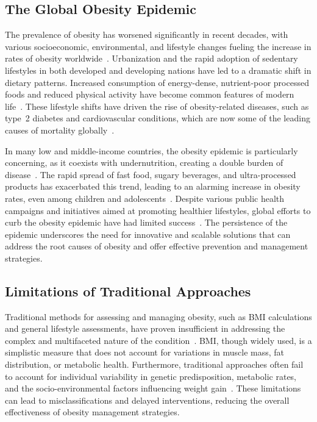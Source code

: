 \documentclass[12pt, a4paper]{article}
\begin{document}
\subsection{The Global Obesity Epidemic}

The prevalence of obesity has worsened significantly in recent decades, with various
socioeconomic, environmental, and lifestyle changes fueling the increase in rates of
obesity worldwide~\cite{ng2014}. Urbanization and the rapid adoption of sedentary
lifestyles in both developed and developing nations have led to a dramatic shift in
dietary patterns. Increased consumption of energy-dense, nutrient-poor processed foods
and reduced physical activity have become common features of modern life~\cite{popkin2012}.
These lifestyle shifts have driven the rise of obesity-related diseases, such as type~2
diabetes and cardiovascular conditions, which are now some of the leading causes of
mortality globally~\cite{swinburn2011}.

In many low and middle-income countries, the obesity epidemic is particularly concerning,
as it coexists with undernutrition, creating a double burden of disease~\cite{tzioumis2014}.
The rapid spread of fast food, sugary beverages, and ultra-processed products has
exacerbated this trend, leading to an alarming increase in obesity rates, even among
children and adolescents~\cite{lobstein2015}. Despite various public health campaigns and
initiatives aimed at promoting healthier lifestyles, global efforts to curb the obesity
epidemic have had limited success~\cite{swinburn2011}. The persistence of the epidemic
underscores the need for innovative and scalable solutions that can address the root
causes of obesity and offer effective prevention and management strategies.

\subsection{Limitations of Traditional Approaches}

Traditional methods for assessing and managing obesity, such as BMI calculations
and general lifestyle assessments, have proven insufficient in addressing the complex
and multifaceted nature of the condition~\cite{hruby2015}. BMI, though widely used,
is a simplistic measure that does not account for variations in muscle mass, fat
distribution, or metabolic health. Furthermore, traditional approaches often fail to
account for individual variability in genetic predisposition, metabolic rates, and the
socio-environmental factors influencing weight gain~\cite{wells2012}. These
limitations can lead to misclassifications and delayed interventions, reducing the
overall effectiveness of obesity management strategies.
\end{document}
